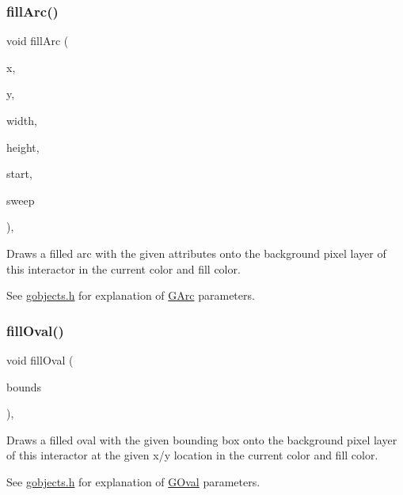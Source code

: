 \subsubsection{\texorpdfstring{fill\+Arc()}{fillArc()}}
{\footnotesize\ttfamily void fill\+Arc (\begin{DoxyParamCaption}\item[{double}]{x,  }\item[{double}]{y,  }\item[{double}]{width,  }\item[{double}]{height,  }\item[{double}]{start,  }\item[{double}]{sweep }\end{DoxyParamCaption})\hspace{0.3cm}{\ttfamily [virtual]}, {\ttfamily [inherited]}}



Draws a filled arc with the given attributes onto the background pixel layer of this interactor in the current color and fill color. 

See \mbox{\hyperlink{gobjects_8h_source}{gobjects.\+h}} for explanation of \mbox{\hyperlink{classGArc}{G\+Arc}} parameters. \mbox{\label{classGDrawingSurface_a1ea6e48d59fb588797dba4deab1397e0}} 
\subsubsection{\texorpdfstring{fill\+Oval()}{fillOval()}\hspace{0.1cm}{\footnotesize\ttfamily [1/2]}}
{\footnotesize\ttfamily void fill\+Oval (\begin{DoxyParamCaption}\item[{const \mbox{\hyperlink{structGRectangle}{G\+Rectangle}} \&}]{bounds }\end{DoxyParamCaption})\hspace{0.3cm}{\ttfamily [virtual]}, {\ttfamily [inherited]}}



Draws a filled oval with the given bounding box onto the background pixel layer of this interactor at the given x/y location in the current color and fill color. 

See \mbox{\hyperlink{gobjects_8h_source}{gobjects.\+h}} for explanation of \mbox{\hyperlink{classGOval}{G\+Oval}} parameters. \mbox{\label{classGDrawingSurface_a28c700c82f31cd328a4629273420ee61}} 
